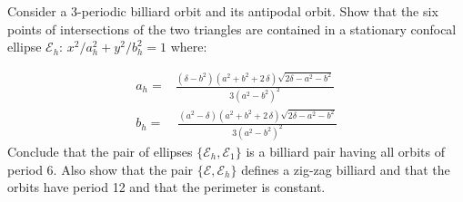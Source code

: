 \begin{exercise}
 Consider a 3-periodic billiard orbit and its antipodal orbit. Show that the six points of intersections of the two triangles are contained in a stationary confocal ellipse $\mathcal{E}_h$: $x^2/a_h^2+y^2/b_h^2=1$ where:


\begin{align*}
	a_h=& {\frac { \left(  \delta -b^2\right) \left( {a}^{2}+{b}^{2}+2\,\delta \right)\sqrt {2\delta-{a}^{2}-{b}^{2} 
			 }  }{3 \left( {a}^{2}-{
				b}^{2} \right) ^{2}}}\\
b_h=&  \,{\frac {\left( {a}^{2}-\delta \right)  \left( {a}^{2}+{b}^{2}+2\,\delta \right) \sqrt {2\delta -{a}^{2
			}-{b}^{2} } }{3 \left( {a}^{2}-
		{b}^{2} \right) ^{2}}}
%
\end{align*}
Conclude that the pair of ellipses $\{\mathcal{E}_h, \mathcal{E}_1\}$ is a billiard pair having all orbits of period 6.
Also show that the pair $\{\mathcal{E} , \mathcal{E}_h \}$ defines a zig-zag billiard and that the orbits have period 12 and  that the perimeter is  constant. %
\end{exercise}

